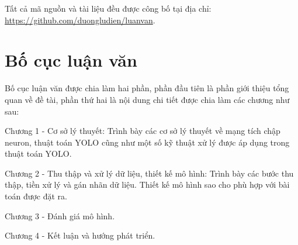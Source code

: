 \documentclass[../thesis.tex]{subfiles}
\begin{document}
Tất cả mã nguồn và tài liệu đều được công bố tại địa chỉ: \url{https://github.com/duongludien/luanvan}.

\section{Bố cục luận văn}

Bố cục luận văn được chia làm hai phần, phần đầu tiên là phần giới thiệu tổng quan về đề tài, phần thứ hai là nội dung chi tiết được chia làm các chương như sau:

Chương 1 - Cơ sở lý thuyết: Trình bày các cơ sở lý thuyết về mạng tích chập neuron, thuật toán YOLO cũng như một số kỹ thuật xử lý được áp dụng trong thuật toán YOLO.

Chương 2 - Thu thập và xử lý dữ liệu, thiết kế mô hình: Trình bày các bước thu thập, tiền xử lý và gán nhãn dữ liệu. Thiết kế mô hình sao cho phù hợp với bài toán được đặt ra.

Chương 3 - Đánh giá mô hình.

Chương 4 - Kết luận và hướng phát triển.
\end{document}
